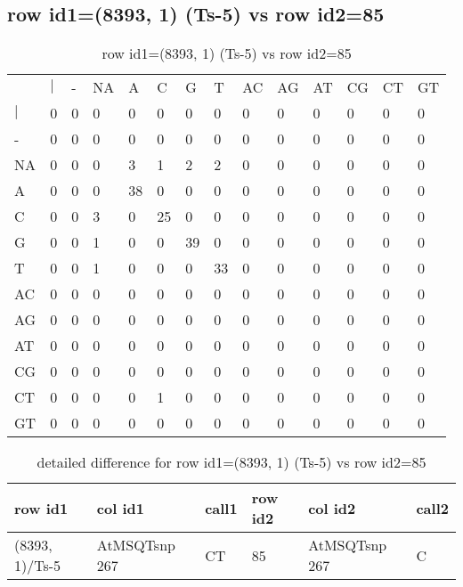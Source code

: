\subsection{row id1=(8393, 1) (Ts-5) vs row id2=85}
\begin{center}
\begin{longtable}{|l|l|l|l|l|l|l|l|l|l|l|l|l|l|}
\caption{row id1=(8393, 1) (Ts-5) vs row id2=85} \label{table_dm642}\\
\hline
\\
\hline
&$|$&-&NA&A&C&G&T&AC&AG&AT&CG&CT&GT\\
$|$&0&0&0&0&0&0&0&0&0&0&0&0&0\\
-&0&0&0&0&0&0&0&0&0&0&0&0&0\\
NA&0&0&0&3&1&2&2&0&0&0&0&0&0\\
A&0&0&0&38&0&0&0&0&0&0&0&0&0\\
C&0&0&3&0&25&0&0&0&0&0&0&0&0\\
G&0&0&1&0&0&39&0&0&0&0&0&0&0\\
T&0&0&1&0&0&0&33&0&0&0&0&0&0\\
AC&0&0&0&0&0&0&0&0&0&0&0&0&0\\
AG&0&0&0&0&0&0&0&0&0&0&0&0&0\\
AT&0&0&0&0&0&0&0&0&0&0&0&0&0\\
CG&0&0&0&0&0&0&0&0&0&0&0&0&0\\
CT&0&0&0&0&1&0&0&0&0&0&0&0&0\\
GT&0&0&0&0&0&0&0&0&0&0&0&0&0\\
\hline
\end{longtable}
\end{center}

\begin{center}
\begin{longtable}{|l|l|l|l|l|l|}
\caption{detailed difference for row id1=(8393, 1) (Ts-5) vs row id2=85} \label{table_dm643}\\
\hline
row id1&col id1&call1&row id2&col id2&call2\\
\hline
(8393, 1)/Ts-5&AtMSQTsnp 267&CT&85&AtMSQTsnp 267&C\\
\hline
\end{longtable}
\end{center}

